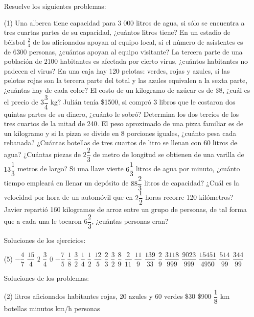 \documentclass[sin nombre]{srs}
\begin{document}
Resuelve los siguientes problemas:\\[0pt]
\begin{preguntas}[after-item-skip=15pt,after-skip=20pt](1)
\pregunta Una alberca tiene capacidad para 3 000 litros de agua, si sólo se encuentra a tres cuartas partes de su capacidad, ¿cuántos litros tiene?
\pregunta En un estadio de béisbol $\frac{2}{3}$ de los aficionados apoyan al equipo local, si el número de asistentes es de 6300 personas, ¿cuántas apoyan al equipo visitante?
\pregunta La tercera parte de una población de 2100 habitantes es afectada por cierto virus, ¿cuántos habitantes no padecen el virus?
\pregunta En una caja hay 120 pelotas: verdes, rojas y azules, si las pelotas rojas son la tercera parte del total y las azules equivalen a la sexta parte, ¿cuántas hay de cada color?
\pregunta El costo de un kilogramo de azúcar es de \$8, ¿cuál es el precio de $3\dfrac{3}{4}$ kg?
\pregunta Julián tenía \$1500, si compró 3 libros que le costaron dos quintas partes de su dinero, ¿cuánto le sobró?
\pregunta Determina los dos tercios de los tres cuartos de la mitad de 240.
\pregunta El peso aproximado de una pizza familiar es de un kilogramo y si la pizza se divide en 8 porciones iguales, ¿cuánto pesa cada rebanada?
\pregunta ¿Cuántas botellas de tres cuartos de litro se llenan con 60 litros de agua?
\pregunta ¿Cuántas piezas de $2\dfrac{2}{3}$ de metro de longitud se obtienen de una varilla de $13\dfrac{1}{3}$ metros de largo?
\pregunta Si una llave vierte $6\dfrac{1}{3}$ litros de agua por minuto, ¿cuánto tiempo empleará en llenar un depósito de $88\dfrac{2}{3}$ litros de capacidad?
\pregunta ¿Cuál es la velocidad por hora de un automóvil que en $2\dfrac{1}{2}$ horas recorre 120 kilómetros?
\pregunta Javier repartió 160 kilogramos de arroz entre un grupo de personas, de tal forma que a cada una le tocaron $6\dfrac{2}{3}$, ¿cuántas personas eran?
\end{preguntas}

Soluciones de los ejercicios:\\
\begin{preguntas}[after-item-skip=15pt,resume=false,after-skip=20pt](5)
\pregunta $-\dfrac{4}{7}$
\pregunta $\dfrac{15}{4}$
\pregunta $2$
\pregunta $\dfrac{3}{4}$
\pregunta $0$
\pregunta $-\dfrac{7}{5}$
\pregunta $\dfrac{1}{8}$
\pregunta $\dfrac{3}{2}$
\pregunta $\dfrac{1}{4}$
\pregunta $\dfrac{1}{2}$
\pregunta $\dfrac{12}{5}$
\pregunta $\dfrac{2}{3}$
\pregunta $\dfrac{3}{2}$
\pregunta $\dfrac{8}{9}$
\pregunta $\dfrac{2}{11}$
\pregunta $\dfrac{11}{9}$
\pregunta $\dfrac{139}{33}$
\pregunta $\dfrac{2}{9}$
\pregunta $\dfrac{3118}{999}$
\pregunta $\dfrac{9023}{999}$
\pregunta $\dfrac{15451}{4950}$
\pregunta $\dfrac{514}{99}$
\pregunta $\dfrac{344}{99}$
\end{preguntas}

Soluciones de los problemas:\\
\begin{preguntas}[after-item-skip=15pt,after-skip=20pt](2)
 litros
 aficionados
 habitantes
 rojas, 20 azules y 60 verdes
\pregunta \$30
\pregunta \$900
\pregunta $\dfrac{1}{8}$ km
 botellas
 minutos
 km/h
 personas
\end{preguntas}
\end{document}
